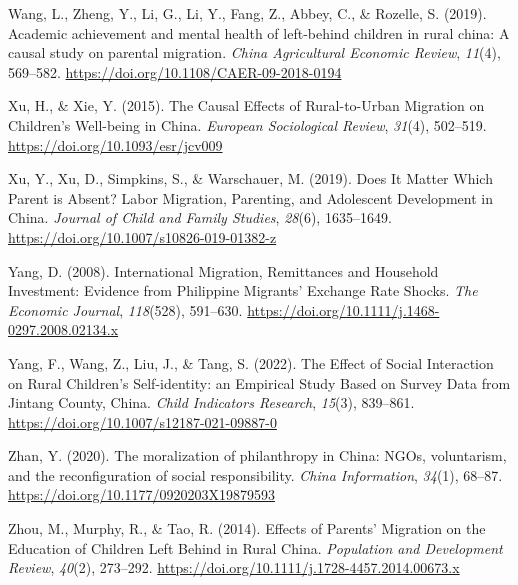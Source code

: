 \documentclass[
  man,floatsintext]{apa7}
\newlength{\cslhangindent}
\newlength{\cslentryspacingunit} %
\newenvironment{CSLReferences}[2] %
 {%
  \setlength{\parindent}{0pt}
  \ifodd #1
  \let\oldpar\par
  \def\par{\hangindent=\cslhangindent\oldpar}
  \fi
  \setlength{\parskip}{#2\cslentryspacingunit}
 }%
 {}
\begin{document}
\begin{CSLReferences}{1}{0}
\leavevmode{}%
Wang, L., Zheng, Y., Li, G., Li, Y., Fang, Z., Abbey, C., \& Rozelle, S. (2019). Academic achievement and mental health of left-behind children in rural china: A causal study on parental migration. \emph{China Agricultural Economic Review}, \emph{11}(4), 569--582. \url{https://doi.org/10.1108/CAER-09-2018-0194}

\leavevmode{}%
Xu, H., \& Xie, Y. (2015). The Causal Effects of Rural-to-Urban Migration on Children{'}s Well-being in China. \emph{European Sociological Review}, \emph{31}(4), 502--519. \url{https://doi.org/10.1093/esr/jcv009}

\leavevmode{}%
Xu, Y., Xu, D., Simpkins, S., \& Warschauer, M. (2019). Does It Matter Which Parent is Absent? Labor Migration, Parenting, and Adolescent Development in China. \emph{Journal of Child and Family Studies}, \emph{28}(6), 1635--1649. \url{https://doi.org/10.1007/s10826-019-01382-z}

\leavevmode{}%
Yang, D. (2008). International Migration, Remittances and Household Investment: Evidence from Philippine Migrants{'} Exchange Rate Shocks. \emph{The Economic Journal}, \emph{118}(528), 591--630. \url{https://doi.org/10.1111/j.1468-0297.2008.02134.x}

\leavevmode{}%
Yang, F., Wang, Z., Liu, J., \& Tang, S. (2022). The Effect of Social Interaction on Rural Children{'}s Self-identity: an Empirical Study Based on Survey Data from Jintang County, China. \emph{Child Indicators Research}, \emph{15}(3), 839--861. \url{https://doi.org/10.1007/s12187-021-09887-0}

\leavevmode{}%
Zhan, Y. (2020). The moralization of philanthropy in China: NGOs, voluntarism, and the reconfiguration of social responsibility. \emph{China Information}, \emph{34}(1), 68--87. \url{https://doi.org/10.1177/0920203X19879593}

\leavevmode{}%
Zhou, M., Murphy, R., \& Tao, R. (2014). Effects of Parents' Migration on the Education of Children Left Behind in Rural China. \emph{Population and Development Review}, \emph{40}(2), 273--292. \url{https://doi.org/10.1111/j.1728-4457.2014.00673.x}

\end{CSLReferences}
\end{document}
